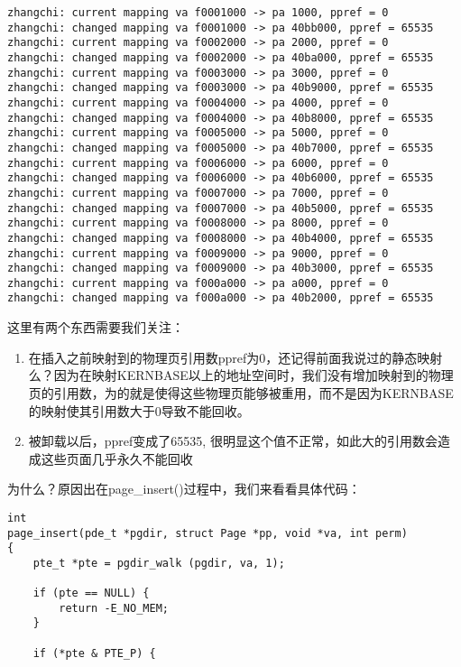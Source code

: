 \documentclass{article}
\newcommand{\funcname}[1]{{\ttfamily \small #1}}
\begin{document}
\begin{CJK*}{UTF8}{gkai}
\begin{lstlisting}[style=console]
zhangchi: current mapping va f0001000 -> pa 1000, ppref = 0
zhangchi: changed mapping va f0001000 -> pa 40bb000, ppref = 65535
zhangchi: current mapping va f0002000 -> pa 2000, ppref = 0
zhangchi: changed mapping va f0002000 -> pa 40ba000, ppref = 65535
zhangchi: current mapping va f0003000 -> pa 3000, ppref = 0
zhangchi: changed mapping va f0003000 -> pa 40b9000, ppref = 65535
zhangchi: current mapping va f0004000 -> pa 4000, ppref = 0
zhangchi: changed mapping va f0004000 -> pa 40b8000, ppref = 65535
zhangchi: current mapping va f0005000 -> pa 5000, ppref = 0
zhangchi: changed mapping va f0005000 -> pa 40b7000, ppref = 65535
zhangchi: current mapping va f0006000 -> pa 6000, ppref = 0
zhangchi: changed mapping va f0006000 -> pa 40b6000, ppref = 65535
zhangchi: current mapping va f0007000 -> pa 7000, ppref = 0
zhangchi: changed mapping va f0007000 -> pa 40b5000, ppref = 65535
zhangchi: current mapping va f0008000 -> pa 8000, ppref = 0
zhangchi: changed mapping va f0008000 -> pa 40b4000, ppref = 65535
zhangchi: current mapping va f0009000 -> pa 9000, ppref = 0
zhangchi: changed mapping va f0009000 -> pa 40b3000, ppref = 65535
zhangchi: current mapping va f000a000 -> pa a000, ppref = 0
zhangchi: changed mapping va f000a000 -> pa 40b2000, ppref = 65535
\end{lstlisting}

这里有两个东西需要我们关注：

\begin{enumerate}
\item{在插入之前映射到的物理页引用数ppref为0，还记得前面我说过的静态映射么？因为在映射KERNBASE以上的地址空间时，我们没有增加映射到的物理页的引用数，为的就是使得这些物理页能够被重用，而不是因为KERNBASE的映射使其引用数大于0导致不能回收。}
\item{被卸载以后，ppref变成了65535, 很明显这个值不正常，如此大的引用数会造成这些页面几乎永久不能回收}
\end{enumerate}

为什么？原因出在\funcname{page\_insert()}过程中，我们来看看具体代码：


\begin{lstlisting}[style=ccode, title={\scriptsize \ttfamily \bfseries kern/pmap.c: page\_insert()}]
int
page_insert(pde_t *pgdir, struct Page *pp, void *va, int perm) 
{
    pte_t *pte = pgdir_walk (pgdir, va, 1);

    if (pte == NULL) {
        return -E_NO_MEM;
    }

    if (*pte & PTE_P) {


\end{lstlisting}
\end{CJK*}
\end{document}
